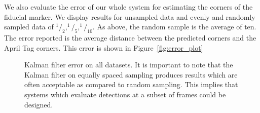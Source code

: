 \documentclass[letterpaper,10pt,conference]{IEEEtran}
\begin{document}
We also evaluate the error of our whole system for estimating the corners of the fiducial marker.  We display results for unsampled data and evenly and randomly sampled data of $^1/_2, ^1/_5, ^1/_10$.  As above, the random sample is the average of ten.  The error reported is the average distance between the predicted corners and the April Tag corners. This error is shown in Figure~\ref{fig:error_plot}
\begin{figure}
\centering
{}

\caption{Kalman filter error on all datasets.  It is important to note that the Kalman filter on equally spaced sampling produces results which are often acceptable as compared to random sampling. This implies that systems which evaluate detections at a subset of frames could be designed.}
\label{fig:kalman_error}
\end{figure}
\end{document}
